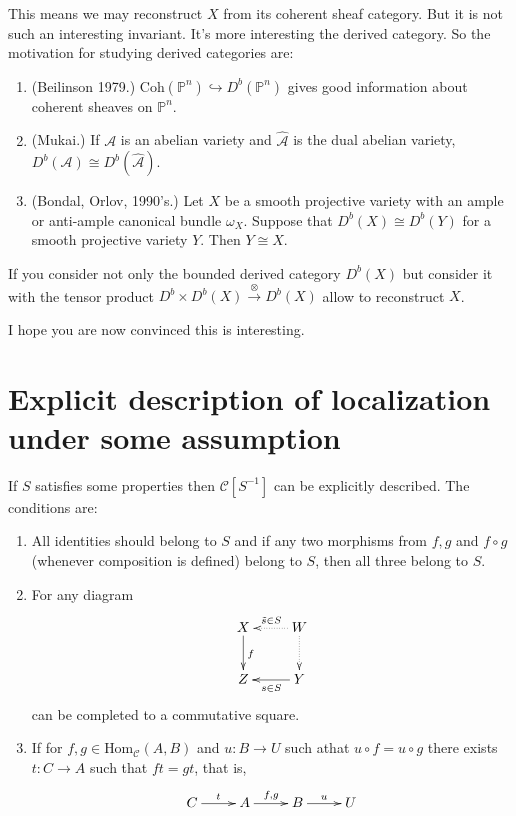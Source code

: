 This means we may reconstruct $X$ from its coherent sheaf category. But it is
not such an interesting invariant. It's more interesting the derived category.
So the motivation for studying derived categories are:

\begin{enumerate}
\item (Beilinson 1979.) $\text{Coh}(\mathbb{P}^n)\hookrightarrow
D^b(\mathbb{P}^n)$ gives good information about coherent sheaves on
$\mathbb{P}^n$.
\item (Mukai.) If $\mathcal{A}$ is an abelian variety and $\hat{\mathcal{A}}$ is
the dual abelian variety, $D^b(\mathcal{A})\cong D^b(\hat{\mathcal{A}})$.
\item (Bondal, Orlov, 1990's.) Let $X$ be a smooth projective variety with an
ample or anti-ample canonical bundle $\omega_X$. Suppose that $D^b(X)\cong
D^b(Y)$ for a smooth projective variety $Y$. Then $Y \cong X$.
\end{enumerate}

\begin{remark}
\label{remark-derived-category-with-tensor-product}
If you consider not only the bounded derived category $D^b(X)$ but consider it
with the tensor product $D^b \times D^b(X) \xrightarrow{\otimes} D^b(X)$ allow
to reconstruct $X$.
\end{remark}

I hope you are now convinced this is interesting.

\section{Explicit description of localization under some assumption}
\label{subsection-explicit-description-of-localization}

If $S$ satisfies some properties then $\mathcal{C}[S^{-1}]$ can be explicitly
described. The conditions are:

\begin{enumerate}
\item All identities should belong to $S$ and if any two morphisms from $f,g$
and $f \circ g$ (whenever composition is defined) belong to $S$, then all three
belong to $S$.
\item For any diagram 
$$
\xymatrix{
X\ar[d]^{f}&W\ar@{.>}[l]_{\tilde{s}\in S}\ar@{.>}[d]\\
Z&\ar[l]^{s\in S}Y
}
$$
can be completed to a commutative square.
\item If for $f,g\in \text{Hom}_{\mathcal{C}}(A,B)$ and $u:B \to U$ such athat
$u\circ f=u\circ g$ there exists
$t:C \to A$ such that $ft=gt$, that is,
$$
\xymatrix{
C\ar[r]^{t}&A\ar[r]^{f,g}&B\ar[r]^{u}&U
}
$$
\end{enumerate}

